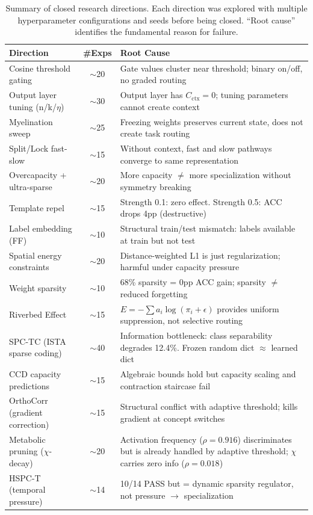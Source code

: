 \documentclass{article}
\begin{document}
\begin{table}[h]
\centering
\caption{Summary of closed research directions. Each direction was explored with multiple hyperparameter configurations and seeds before being closed. ``Root cause'' identifies the fundamental reason for failure.}
\label{tab:closed}
\small
\begin{tabular}{p{3.0cm}cp{6.2cm}}
\toprule
Direction & \#Exps & Root Cause \\
\midrule
Cosine threshold gating & $\sim$20 & Gate values cluster near threshold; binary on/off, no graded routing \\
Output layer tuning (n/k/$\eta$) & $\sim$30 & Output layer has $C_\mathrm{ctx} = 0$; tuning parameters cannot create context \\
Myelination sweep & $\sim$25 & Freezing weights preserves current state, does not create task routing \\
Split/Lock fast-slow & $\sim$15 & Without context, fast and slow pathways converge to same representation \\
Overcapacity + ultra-sparse & $\sim$20 & More capacity $\neq$ more specialization without symmetry breaking \\
Template repel & $\sim$15 & Strength 0.1: zero effect. Strength 0.5: ACC drops 4pp (destructive) \\
Label embedding (FF) & $\sim$10 & Structural train/test mismatch: labels available at train but not test \\
Spatial energy constraints & $\sim$20 & Distance-weighted L1 is just regularization; harmful under capacity pressure \\
Weight sparsity & $\sim$10 & 68\% sparsity = 0pp ACC gain; sparsity $\neq$ reduced forgetting \\
Riverbed Effect & $\sim$15 & $E = -\sum a_i \log(\pi_i + \epsilon)$ provides uniform suppression, not selective routing \\
SPC-TC (ISTA sparse coding) & $\sim$40 & Information bottleneck: class separability degrades 12.4\%. Frozen random dict $\approx$ learned dict \\
CCD capacity predictions & $\sim$15 & Algebraic bounds hold but capacity scaling and contraction staircase fail \\
OrthoCorr (gradient correction) & $\sim$15 & Structural conflict with adaptive threshold; kills gradient at concept switches \\
Metabolic pruning ($\chi$-decay) & $\sim$20 & Activation frequency ($\rho = 0.916$) discriminates but is already handled by adaptive threshold; $\chi$ carries zero info ($\rho = 0.018$) \\
HSPC-T (temporal pressure) & $\sim$14 & 10/14 PASS but = dynamic sparsity regulator, not pressure $\to$ specialization \\
\bottomrule
\end{tabular}
\end{table}
\end{document}
